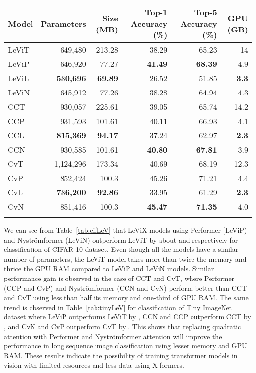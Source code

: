 \documentclass{article}
\begin{document}
 
\begin{table*}[h]
\centering
\begin{tabular}{lrrrrr}
\hline
\textbf{Model} & \textbf{Parameters} & \textbf{Size (MB)} & \textbf{Top-1 Accuracy (\%)} & \textbf{Top-5 Accuracy (\%)} & \textbf{GPU (GB)} \\ \hline
LeViT & 649,480 & 213.28 & 38.29 & 65.23 & 14 \\
LeViP & 646,920 & 77.27 & \textbf{41.49} & \textbf{68.39} & 4.9 \\
LeViL & \textbf{530,696} & \textbf{69.89} & 26.52 & 51.85 & \textbf{3.3} \\
LeViN & 645,912 & 77.26 & 38.28 & 64.94 & 4.3 \\
\hline
CCT & 930,057 & 225.61 & 39.05 & 65.74 & 14.2 \\
CCP & 931,593 & 101.61 & 40.11 & 66.93 & 4.1 \\
CCL & \textbf{815,369} & \textbf{94.17} & 37.24 & 62.97 & \textbf{2.3} \\
CCN & 930,585 & 101.61 & \textbf{40.80} & \textbf{67.81} & 3.9 \\
\hline
CvT & 1,124,296 & 173.34 & 40.69 & 68.19 & 12.3 \\
CvP & 852,424 & 100.3 & 45.26 & 71.21 & 4.4 \\
CvL & \textbf{736,200} & \textbf{92.86} & 33.95 & 61.29 & \textbf{2.3} \\
CvN & 851,416 & 100.3 & \textbf{45.47} & \textbf{71.35} & 4.0 \\
\hline \\
\end{tabular}\caption{Comparison of different convolutional transformers without and with linear attention mechanisms on Tiny ImageNet dataset}
\label{tab:tinyLeV}
\end{table*}




We can see from Table~\ref{tab:cifLeV} that LeViX models using Performer (LeViP) and Nyströmformer (LeViN) outperform LeViT by about  and  respectively for classification of CIFAR-10 dataset. Even though all the models have a similar number of parameters, the LeViT model takes more than twice the memory and thrice the GPU RAM compared to LeViP and LeViN models. Similar performance gain is observed in the case of CCT and CvT, where Performer (CCP and CvP) and Nyströmformer (CCN and CvN) perform better than CCT and CvT using less than half its memory and one-third of GPU RAM. The same trend is observed in Table~\ref{tab:tinyLeV} for classification of Tiny ImageNet dataset where LeViP outperforms LeViT by , CCN and CCP outperform CCT by , and CvN and CvP outperform CvT by . This shows that replacing quadratic attention with Performer and Nyströmformer attention will improve the performance in long sequence image classification using lesser memory and GPU RAM. These results indicate the possibility of training transformer models in vision with limited resources and less data using X-formers.
\end{document}
